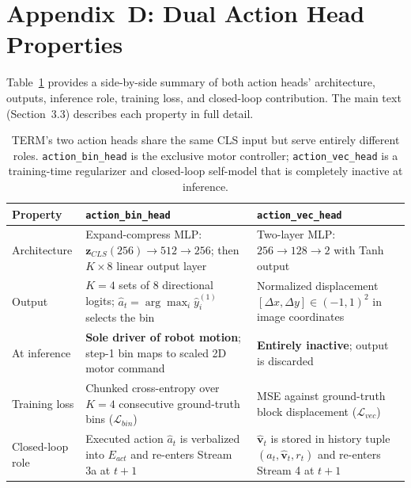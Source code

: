 \documentclass[letterpaper]{article} %
\def\UrlFont{\rm}  %
\begin{document}
\section*{Appendix~D: Dual Action Head Properties}

Table~\ref{tab:heads} provides a side-by-side summary of both action heads' architecture, outputs, inference role, training loss, and closed-loop contribution. The main text (Section~3.3) describes each property in full detail.

\begin{table}[h]
\centering
\setlength{\tabcolsep}{4pt}
\small
\begin{tabular}{lp{5.6cm}p{5.6cm}}
\toprule
\textbf{Property} & \textbf{\texttt{action\_bin\_head}} & \textbf{\texttt{action\_vec\_head}} \\
\midrule
Architecture
  & Expand-compress MLP: $\mathbf{z}_{CLS}(256)\!\to\!512\!\to\!256$; then $K{\times}8$ linear output layer
  & Two-layer MLP: $256\!\to\!128\!\to\!2$ with Tanh output \\
Output
  & $K{=}4$ sets of 8 directional logits; $\hat{a}_t {=} \arg\max_i \hat{y}^{(1)}_i$ selects the bin
  & Normalized displacement $[\Delta x, \Delta y] \in (-1,1)^2$ in image coordinates \\
At inference
  & \textbf{Sole driver of robot motion}; step-1 bin maps to scaled 2D motor command
  & \textbf{Entirely inactive}; output is discarded \\
Training loss
  & Chunked cross-entropy over $K{=}4$ consecutive ground-truth bins ($\mathcal{L}_{bin}$)
  & MSE against ground-truth block displacement ($\mathcal{L}_{vec}$) \\
Closed-loop role
  & Executed action $\hat{a}_t$ is verbalized into $E_{act}$ and re-enters Stream 3a at $t{+}1$
  & $\hat{\mathbf{v}}_t$ is stored in history tuple $(a_t, \hat{\mathbf{v}}_t, r_t)$ and re-enters Stream 4 at $t{+}1$ \\
\bottomrule
\end{tabular}
\caption{\small TERM's two action heads share the same CLS input but serve entirely different roles. \texttt{action\_bin\_head} is the exclusive motor controller; \texttt{action\_vec\_head} is a training-time regularizer and closed-loop self-model that is completely inactive at inference.}
\label{tab:heads}
\end{table}

%


\end{document}

